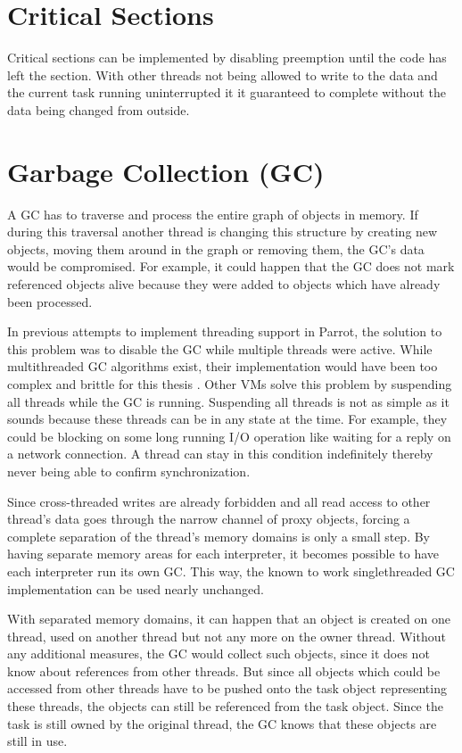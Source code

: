 \documentclass[bachelor,english]{hgbthesis}
\begin{document}
\section{Critical Sections}

Critical sections can be implemented by disabling preemption until the code has left the section. With other threads not being allowed to write to the data and the current task running uninterrupted it it guaranteed to complete without the data being changed from outside.

\section{Garbage Collection (GC)}

A GC has to traverse and process the entire graph of objects in memory. If during this traversal another thread is changing this structure by creating new objects, moving them around in the graph or removing them, the GC's data would be compromised. For example, it could happen that the GC does not mark referenced objects alive because they were added to objects which have already been processed.

In previous attempts to implement threading support in Parrot, the solution to this problem was to disable the GC while multiple threads were active. While multithreaded GC algorithms exist, their implementation would have been too complex and brittle for this thesis \cite{VCGC}. Other VMs solve this problem by suspending all threads while the GC is running. Suspending all threads is not as simple as it sounds because these threads can be in any state at the time. For example, they could be blocking on some long running I/O operation like waiting for a reply on a network connection. A thread can stay in this condition indefinitely thereby never being able to confirm synchronization.

Since cross-threaded writes are already forbidden and all read access to other thread's data goes through the narrow channel of proxy objects, forcing a complete separation of the thread's memory domains is only a small step. By having separate memory areas for each interpreter, it becomes possible to have each interpreter run its own GC. This way, the known to work singlethreaded GC implementation can be used nearly unchanged.

With separated memory domains, it can happen that an object is created on one thread, used on another thread but not any more on the owner thread. Without any additional measures, the GC would collect such objects, since it does not know about references from other threads. But since all objects which could be accessed from other threads have to be pushed onto the task object representing these threads, the objects can still be referenced from the task object. Since the task is still owned by the original thread, the GC knows that these objects are still in use.
\end{document}
